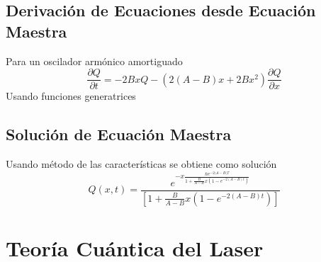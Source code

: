\documentclass{book}
\begin{document}
       \subsection{Derivación de Ecuaciones desde Ecuación Maestra} Para un oscilador armónico amortiguado \begin{equation}{\frac{\partial Q}{\partial t}=-2BxQ-(2(A-B)x+2Bx^2)\frac{\partial Q}{\partial x}} \end{equation}
       Usando funciones generatrices
       \subsection{Solución de Ecuación Maestra} Usando método de las características se obtiene como solución
       \begin{equation}{Q(x,t)=\frac{e^{-x\frac{\bar{n}e^{-2(A-B(T}}{1+\frac{B}{A-B}x(1-e^{-2(A-B)t})}}}{[1+\frac{B}{A-B}x(1-e^{-2(A-B)t})]}}\end{equation}
   \section{Teoría Cuántica del Laser}
\end{document}
